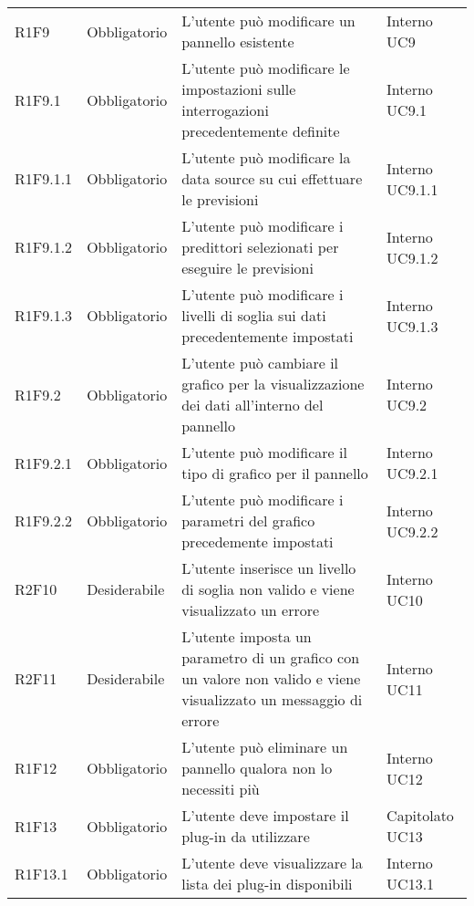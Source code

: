 \begin{longtable} {
		>{\centering}p{18mm} 
		>{\centering}p{28mm}
		>{}p{50mm} 
		>{}p{28mm}
	}
		R1F9 & Obbligatorio & L'utente può modificare un pannello esistente & Interno UC9 \TBstrut \\ [2mm]

		R1F9.1 & Obbligatorio & L'utente può modificare le impostazioni sulle interrogazioni precedentemente definite & Interno UC9.1 \TBstrut \\ [2mm]

		R1F9.1.1 & Obbligatorio & L'utente può modificare la data source su cui effettuare le previsioni & Interno UC9.1.1 \TBstrut \\ [2mm]

		R1F9.1.2 & Obbligatorio & L'utente può modificare i predittori selezionati per eseguire le previsioni & Interno UC9.1.2 \TBstrut \\ [2mm]

		R1F9.1.3 & Obbligatorio & L'utente può modificare i livelli di soglia sui dati precedentemente impostati & Interno UC9.1.3 \TBstrut \\ [2mm]

		R1F9.2 & Obbligatorio & L'utente può cambiare il grafico per la visualizzazione dei dati all'interno del pannello & Interno UC9.2 \TBstrut \\ [2mm]

		R1F9.2.1 & Obbligatorio & L'utente può modificare il tipo di grafico per il pannello & Interno UC9.2.1 \TBstrut \\ [2mm]

		R1F9.2.2 & Obbligatorio & L'utente può modificare i parametri del grafico precedemente impostati & Interno UC9.2.2 \TBstrut \\ [2mm]

		R2F10 & Desiderabile & L'utente inserisce un livello di soglia non valido e viene visualizzato un errore & Interno UC10 \TBstrut \\ [2mm]

		R2F11 & Desiderabile & L'utente imposta un parametro di un grafico con un valore non valido e viene visualizzato un messaggio di errore & Interno UC11 \TBstrut \\ [2mm]

		R1F12 & Obbligatorio & L'utente può eliminare un pannello qualora non lo necessiti più & Interno UC12 \TBstrut \\ [2mm]

		R1F13 & Obbligatorio & L'utente deve impostare il plug-in da utilizzare & Capitolato UC13 \TBstrut \\ [2mm]

		R1F13.1 & Obbligatorio & L'utente deve visualizzare la lista dei plug-in disponibili & Interno UC13.1 \TBstrut \\ [2mm]


\end{longtable}
